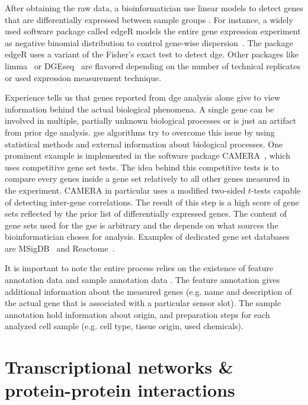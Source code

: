 \documentclass{thesisclass}
\newcommand*\tikzCircled[1]{
	\node[shape=circle,draw,inner sep=2pt, fill=black] (char) {
		\textcolor{white}{#1}
	}
}
\newcommand*\circled[1]{
	\tikz[baseline=(char.base)]{
		\tikzCircled{#1};
	}
}
\begin{document}
After obtaining the raw data, a bioinformatician use linear models to detect genes that are differentially expressed between sample groups \circled{3}. For instance, a widely used software package called edgeR models the entire gene expression experiment as negative binomial distribution to control gene-wise dispersion~\cite{doi:10.1093/bioinformatics/btp616}. The package edgeR uses a variant of the Fisher's exact test to detect \acrfull{dge}. Other packages like limma~\cite{doi:10.1093/nar/gkv007} or DGEseq~\cite{doi:10.1093/bioinformatics/btp612} are flavored depending on the number of technical replicates or used expression measurement technique. 

Experience tells us that genes reported from \acrshort{dge} analysis alone give to view information behind the actual biological phenomena. A single gene can be involved in multiple, partially unknown biological processes or is just an artifact from prior \acrshort{dge} analysis. \acrfull{gse} algorithms try to overcome this issue by using statistical methods and external information about biological processes. One prominent example is implemented in the software package CAMERA~\cite{Wu2012}, which uses competitive gene set tests. The idea behind this competitive tests is to compare every genes inside a gene set relatively to all other genes measured in the experiment. CAMERA in particular uses a modified two-sided $t$-tests capable of detecting inter-gene correlations. The result of this step is a high score \circled{4} of gene sets reflected by the prior list of differentially expressed genes. The content of gene sets used for the \acrshort{gse} is arbitrary and the depends on what sources the bioinformatician choses for analysis. Examples of dedicated gene set databases are MSigDB~\cite{doi:10.1093/bioinformatics/btr260} and Reactome~\cite{doi:10.1093/nar/gki072}. 

It is important to note the entire process relies on the existence of feature annotation data \circled{5} and sample annotation data \circled{6}. The feature annotation gives additional information about the measured genes (e.g. name and description of the actual gene that is associated with a particular sensor slot). The sample annotation hold information about origin, and preparation steps for each analyzed cell sample (e.g. cell type, tissue origin, used chemicals).

\section{Transcriptional networks \& protein-protein interactions}
\end{document}

